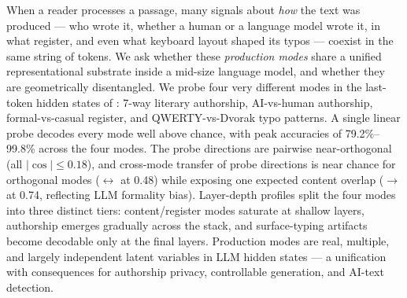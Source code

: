 When a reader processes a passage, many signals about \emph{how} the text was produced --- who wrote it, whether a human or a language model wrote it, in what register, and even what keyboard layout shaped its typos --- coexist in the same string of tokens. We ask whether these \emph{production modes} share a unified representational substrate inside a mid-size language model, and whether they are geometrically disentangled. We probe four very different modes in the last-token hidden states of \qwen: 7-way literary authorship, AI-vs-human authorship, formal-vs-casual register, and QWERTY-vs-Dvorak typo patterns. A single linear probe decodes every mode well above chance, with peak accuracies of 79.2\%--99.8\% across the four modes. The probe directions are pairwise near-orthogonal (all $|\cos| \leq 0.18$), and cross-mode transfer of probe directions is near chance for orthogonal modes (\typo $\leftrightarrow$ \register at 0.48) while exposing one expected content overlap (\register $\to$ \aihuman at 0.74, reflecting LLM formality bias). Layer-depth profiles split the four modes into three distinct tiers: content/register modes saturate at shallow layers, authorship emerges gradually across the stack, and surface-typing artifacts become decodable only at the final layers. Production modes are real, multiple, and largely independent latent variables in LLM hidden states --- a unification with consequences for authorship privacy, controllable generation, and AI-text detection.
